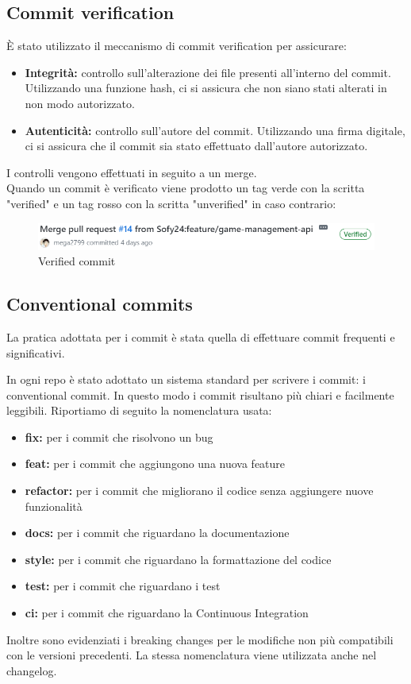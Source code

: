 \subsection{Commit verification}
È stato utilizzato il meccanismo di commit verification per assicurare:
\begin{itemize}
    \item \textbf{Integrità:} controllo sull'alterazione dei file presenti all'interno del commit.  Utilizzando una funzione hash, ci si assicura che non siano stati alterati in non modo autorizzato.
    \item \textbf{Autenticità:} controllo sull'autore del commit. Utilizzando una firma digitale, ci si assicura che il commit sia stato effettuato dall'autore autorizzato.
\end{itemize}
I controlli vengono effettuati in seguito a un merge. \\
Quando un commit è verificato viene prodotto un tag verde con la scritta "verified" e un tag rosso con la scritta "unverified" in caso contrario:
\begin{figure}[h!]
    \centering 
    \includegraphics[scale=0.7]{report/img/verified_commit.png}
    \caption{Verified commit}
    \label{verified_commit}
    \end{figure}
\subsection{Conventional commits}
La pratica adottata per i commit è stata quella di effettuare commit frequenti e significativi.

In ogni repo è stato adottato un sistema standard per scrivere i commit:  i conventional commit. In questo modo i commit risultano più chiari e facilmente leggibili. 
Riportiamo di seguito la nomenclatura usata:
\begin{itemize}
    \item \textbf{fix:} per i commit che risolvono un bug
    \item \textbf{feat:} per i commit che aggiungono una nuova feature
    \item \textbf{refactor:} per i commit che migliorano il codice senza aggiungere nuove funzionalità
    \item \textbf{docs:} per i commit che riguardano la documentazione
    \item \textbf{style:} per i commit che riguardano la formattazione del codice
    \item \textbf{test:} per i commit che riguardano i test
    \item \textbf{ci:} per i commit che riguardano la Continuous Integration
\end{itemize}
Inoltre sono evidenziati i breaking changes per le modifiche non più compatibili con le versioni precedenti.
La stessa nomenclatura viene utilizzata anche nel changelog.

